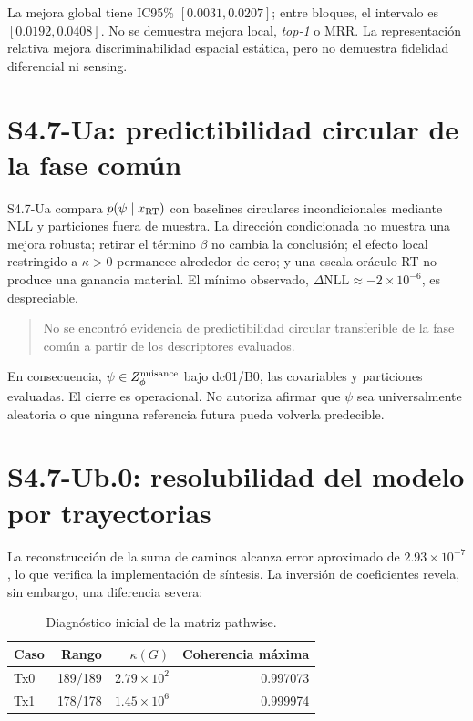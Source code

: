La mejora global tiene IC95\% $[0.0031,0.0207]$; entre bloques, el intervalo es
$[0.0192,0.0408]$. No se demuestra mejora local, \emph{top-1} o MRR. La representación relativa mejora discriminabilidad espacial estática, pero no demuestra fidelidad diferencial ni sensing.

\section{S4.7-Ua: predictibilidad circular de la fase común}

S4.7-Ua compara $p(\psi\mid x_{\rm RT})$ con baselines circulares incondicionales mediante NLL y particiones fuera de muestra. La dirección condicionada no muestra una mejora robusta; retirar el término $\beta$ no cambia la conclusión; el efecto local restringido a $\kappa>0$ permanece alrededor de cero; y una escala oráculo RT no produce una ganancia material. El mínimo observado, $\Delta\mathrm{NLL}\approx-2\times10^{-6}$, es despreciable.

\begin{quote}
No se encontró evidencia de predictibilidad circular transferible de la fase común a partir de los descriptores evaluados.
\end{quote}

En consecuencia, $\psi\in Z_\phi^{\rm nuisance}$ bajo dc01/B0, las covariables y particiones evaluadas. El cierre es operacional. No autoriza afirmar que $\psi$ sea universalmente aleatoria o que ninguna referencia futura pueda volverla predecible.

\section{S4.7-Ub.0: resolubilidad del modelo por trayectorias}
\label{sec:pathwise_resolvability}

La reconstrucción de la suma de caminos alcanza error aproximado de $2.93\times10^{-7}$, lo que verifica la implementación de síntesis. La inversión de coeficientes revela, sin embargo, una diferencia severa:
\begin{table}[htbp]
\centering\small
\caption{Diagnóstico inicial de la matriz pathwise.}
\label{tab:pathwise_smoke}
\begin{tabular}{lrrr}
\toprule
Caso & Rango & $\kappa(G)$ & Coherencia máxima\\
\midrule
Tx0 & 189/189 & $2.79\times10^2$ & 0.997073\\
Tx1 & 178/178 & $1.45\times10^6$ & 0.999974\\
\bottomrule
\end{tabular}
\end{table}

